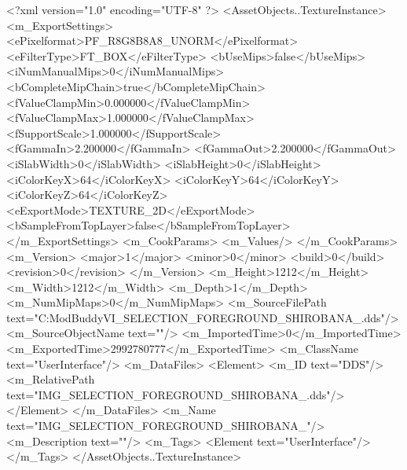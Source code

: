 <?xml version="1.0" encoding="UTF-8" ?>
<AssetObjects..TextureInstance>
	<m_ExportSettings>
		<ePixelformat>PF_R8G8B8A8_UNORM</ePixelformat>
		<eFilterType>FT_BOX</eFilterType>
		<bUseMips>false</bUseMips>
		<iNumManualMips>0</iNumManualMips>
		<bCompleteMipChain>true</bCompleteMipChain>
		<fValueClampMin>0.000000</fValueClampMin>
		<fValueClampMax>1.000000</fValueClampMax>
		<fSupportScale>1.000000</fSupportScale>
		<fGammaIn>2.200000</fGammaIn>
		<fGammaOut>2.200000</fGammaOut>
		<iSlabWidth>0</iSlabWidth>
		<iSlabHeight>0</iSlabHeight>
		<iColorKeyX>64</iColorKeyX>
		<iColorKeyY>64</iColorKeyY>
		<iColorKeyZ>64</iColorKeyZ>
		<eExportMode>TEXTURE_2D</eExportMode>
		<bSampleFromTopLayer>false</bSampleFromTopLayer>
	</m_ExportSettings>
	<m_CookParams>
		<m_Values/>
	</m_CookParams>
	<m_Version>
		<major>1</major>
		<minor>0</minor>
		<build>0</build>
		<revision>0</revision>
	</m_Version>
	<m_Height>1212</m_Height>
	<m_Width>1212</m_Width>
	<m_Depth>1</m_Depth>
	<m_NumMipMaps>0</m_NumMipMaps>
	<m_SourceFilePath text="C:\Users\asus\Documents\Firaxis ModBuddy\Civilization VI\temppic\IMG_SELECTION_FOREGROUND_SHIROBANA_.dds"/>
	<m_SourceObjectName text=""/>
	<m_ImportedTime>0</m_ImportedTime>
	<m_ExportedTime>2992780777</m_ExportedTime>
	<m_ClassName text="UserInterface"/>
	<m_DataFiles>
		<Element>
			<m_ID text="DDS"/>
			<m_RelativePath text="IMG_SELECTION_FOREGROUND_SHIROBANA_.dds"/>
		</Element>
	</m_DataFiles>
	<m_Name text="IMG_SELECTION_FOREGROUND_SHIROBANA_"/>
	<m_Description text=""/>
	<m_Tags>
		<Element text="UserInterface"/>
	</m_Tags>
</AssetObjects..TextureInstance>

